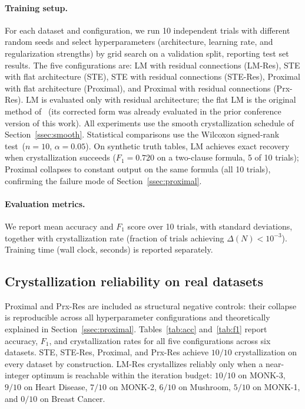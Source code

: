 \documentclass[lettersize,journal]{IEEEtran}
\begin{document}
\paragraph{Training setup.}
For each dataset and configuration, we run 10 independent trials with different
random seeds and select hyperparameters (architecture, learning rate, and
regularization strengths) by grid search on a validation split, reporting
test set results.
The five configurations are:
LM with residual connections (LM-Res), STE with flat architecture (STE),
STE with residual connections (STE-Res), Proximal with flat architecture
(Proximal), and Proximal with residual connections (Prx-Res).
LM is evaluated only with residual architecture; the flat LM is the original
method of~\cite{leandro2009} (its corrected form was already evaluated in the
prior conference version of this work).
All experiments use the smooth crystallization schedule of
Section~\ref{ssec:smooth}.
Statistical comparisons use the Wilcoxon signed-rank test~($n = 10$, $\alpha = 0.05$).
On synthetic truth tables, LM achieves exact recovery when crystallization
succeeds ($F_1 = 0.720$ on a two-clause formula, 5 of 10 trials); Proximal
collapses to constant output on the same formula (all 10 trials), confirming
the failure mode of Section~\ref{ssec:proximal}.

\paragraph{Evaluation metrics.}
We report mean accuracy and $F_1$ score over 10 trials, with standard
deviations, together with crystallization rate (fraction of trials achieving
$\Delta(N) < 10^{-3}$).
Training time (wall clock, seconds) is reported separately.

\subsection{Crystallization reliability on real datasets}
\label{ssec:cryst_real}

Proximal and Prx-Res are included as structural negative controls: their
collapse is reproducible across all hyperparameter configurations and
theoretically explained in Section~\ref{ssec:proximal}.
Tables~\ref{tab:acc} and~\ref{tab:f1} report accuracy, $F_1$, and
crystallization rates for all five configurations across six datasets.
STE, STE-Res, Proximal, and Prx-Res achieve $10/10$ crystallization on every
dataset by construction.
LM-Res crystallizes reliably only when a near-integer optimum is reachable
within the iteration budget: $10/10$ on MONK-3, $9/10$ on Heart Disease,
$7/10$ on MONK-2, $6/10$ on Mushroom, $5/10$ on MONK-1, and $0/10$ on Breast
Cancer.
\end{document}
